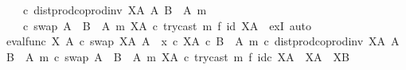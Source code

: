 \begin{isabellebody}
\ \ \ \ {\isasymcirc}\isactrlsub c\ dist{\isacharunderscore}{\kern0pt}prod{\isacharunderscore}{\kern0pt}coprod{\isacharunderscore}{\kern0pt}inv\ {\isacharparenleft}{\kern0pt}X\isactrlbsup A\isactrlesup {\isacharparenright}{\kern0pt}\ A\ {\isacharparenleft}{\kern0pt}B\ {\isasymsetminus}\ {\isacharparenleft}{\kern0pt}A{\isacharcomma}{\kern0pt}\ m{\isacharparenright}{\kern0pt}{\isacharparenright}{\kern0pt}\ \isanewline
\ \ \ \ {\isasymcirc}\isactrlsub c\ swap\ {\isacharparenleft}{\kern0pt}A\ {\isasymCoprod}\ {\isacharparenleft}{\kern0pt}B\ {\isasymsetminus}\ {\isacharparenleft}{\kern0pt}A{\isacharcomma}{\kern0pt}\ m{\isacharparenright}{\kern0pt}{\isacharparenright}{\kern0pt}{\isacharparenright}{\kern0pt}\ {\isacharparenleft}{\kern0pt}X\isactrlbsup A\isactrlesup {\isacharparenright}{\kern0pt}\ {\isasymcirc}\isactrlsub c\ {\isacharparenleft}{\kern0pt}try{\isacharunderscore}{\kern0pt}cast\ m\ {\isasymtimes}\isactrlsub f\ id\ {\isacharparenleft}{\kern0pt}X\isactrlbsup A\isactrlesup {\isacharparenright}{\kern0pt}{\isacharparenright}{\kern0pt}{\isacharparenright}{\kern0pt}\isactrlsup {\isasymsharp}{\isachardoublequoteclose}\ \ exI{\isacharcomma}{\kern0pt}\ auto{\isacharparenright}{\kern0pt}\isanewline
\isanewline
\ \ \ \ \isamarkupfalse%
\ {\isachardoublequoteopen}{\isacharparenleft}{\kern0pt}{\isacharparenleft}{\kern0pt}eval{\isacharunderscore}{\kern0pt}func\ X\ A\ {\isasymcirc}\isactrlsub c\ swap\ {\isacharparenleft}{\kern0pt}X\isactrlbsup A\isactrlesup {\isacharparenright}{\kern0pt}\ A{\isacharparenright}{\kern0pt}\ {\isasymamalg}\ {\isacharparenleft}{\kern0pt}x\ {\isasymcirc}\isactrlsub c\ {\isasymbeta}\isactrlbsub X\isactrlbsup A\isactrlesup \ {\isasymtimes}\isactrlsub c\ {\isacharparenleft}{\kern0pt}B\ {\isasymsetminus}\ {\isacharparenleft}{\kern0pt}A{\isacharcomma}{\kern0pt}\ m{\isacharparenright}{\kern0pt}{\isacharparenright}{\kern0pt}\isactrlesub {\isacharparenright}{\kern0pt}\ {\isasymcirc}\isactrlsub c\ dist{\isacharunderscore}{\kern0pt}prod{\isacharunderscore}{\kern0pt}coprod{\isacharunderscore}{\kern0pt}inv\ {\isacharparenleft}{\kern0pt}X\isactrlbsup A\isactrlesup {\isacharparenright}{\kern0pt}\ A\ {\isacharparenleft}{\kern0pt}B\ {\isasymsetminus}\ {\isacharparenleft}{\kern0pt}A{\isacharcomma}{\kern0pt}\ m{\isacharparenright}{\kern0pt}{\isacharparenright}{\kern0pt}\ {\isasymcirc}\isactrlsub c\ swap\ {\isacharparenleft}{\kern0pt}A\ {\isasymCoprod}\ {\isacharparenleft}{\kern0pt}B\ {\isasymsetminus}\ {\isacharparenleft}{\kern0pt}A{\isacharcomma}{\kern0pt}\ m{\isacharparenright}{\kern0pt}{\isacharparenright}{\kern0pt}{\isacharparenright}{\kern0pt}\ {\isacharparenleft}{\kern0pt}X\isactrlbsup A\isactrlesup {\isacharparenright}{\kern0pt}\ {\isasymcirc}\isactrlsub c\ try{\isacharunderscore}{\kern0pt}cast\ m\ {\isasymtimes}\isactrlsub f\ id\isactrlsub c\ {\isacharparenleft}{\kern0pt}X\isactrlbsup A\isactrlesup {\isacharparenright}{\kern0pt}{\isacharparenright}{\kern0pt}\isactrlsup {\isasymsharp}\ {\isacharcolon}{\kern0pt}\ X\isactrlbsup A\isactrlesup \ {\isasymrightarrow}\ X\isactrlbsup B\isactrlesup {\isachardoublequoteclose}\isanewline

\end{isabellebody}
